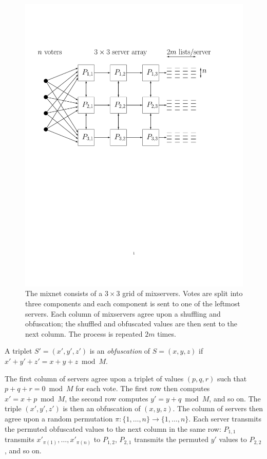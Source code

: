 \begin{figure}[t]
\centering
\includegraphics[width=6in]{mixnet-diagram.pdf}
\caption[The $3 \times 3$ grid of mixservers and the communication among them]{The mixnet consists of a $3 \times 3$ grid of mixservers. Votes are split into three components and each component is sent to one of the leftmost servers. Each column of mixservers agree upon a shuffling and obfuscation; the shuffled and obfuscated values are then sent to the next column. The process is repeated $2m$ times.}
\label{figure:sv:design:mixnet}
\end{figure}

\begin{definition}
A triplet $S' = (x', y', z')$ is an \emph{obfuscation} of $S = (x, y, z)$ if $x'+y'+z' = x+y+z \bmod M$.
\end{definition}

The first column of servers agree upon a triplet of values $(p, q, r)$ such that $p + q + r = 0 \bmod M$ for each vote. The first row then computes $x' = x+p \bmod M$, the second row computes $y' = y+q \bmod M$, and so on. The triple $(x', y', z')$ is then an obfuscation of $(x, y, z)$. The column of servers then agree upon a random permutation $\pi : \{1, \dotsc, n\} \to \{1, \dotsc, n\}$. Each server transmits the permuted obfuscated values to the next column in the same row: $P_{1,1}$ transmits $x'_{\pi(1)}, \dotsc, x'_{\pi(n)}$ to $P_{1,2}$, $P_{2,1}$ transmits the permuted $y'$ values to $P_{2,2}$, and so on.

